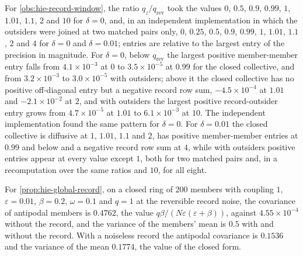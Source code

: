 \begin{numcheck}
For \cref{obs:hie-record-window}, the ratio $q_z/q_{\mathrm{rev}}$ took the values $0$, $0.5$, $0.9$, $0.99$, $1$, $1.01$, $1.1$, $2$ and $10$ for $\delta=0$, and, in an independent implementation in which the outsiders were joined at two matched pairs only, $0$, $0.25$, $0.5$, $0.9$, $0.99$, $1$, $1.01$, $1.1$, $2$ and $4$ for $\delta=0$ and $\delta=0.01$; entries are relative to the largest entry of the precision in magnitude. For $\delta=0$, below $q_{\mathrm{rev}}$ the largest positive member-member entry falls from $4.1\times10^{-3}$ at $0$ to $3.5\times10^{-5}$ at $0.99$ for the closed collective, and from $3.2\times10^{-3}$ to $3.0\times10^{-5}$ with outsiders; above it the closed collective has no positive off-diagonal entry but a negative record row sum, $-4.5\times10^{-4}$ at $1.01$ and $-2.1\times10^{-2}$ at $2$, and with outsiders the largest positive record-outsider entry grows from $4.7\times10^{-5}$ at $1.01$ to $6.1\times10^{-3}$ at $10$. The independent implementation found the same pattern for $\delta=0$. For $\delta=0.01$ the closed collective is diffusive at $1$, $1.01$, $1.1$ and $2$, has positive member-member entries at $0.99$ and below and a negative record row sum at $4$, while with outsiders positive entries appear at every value except $1$, both for two matched pairs and, in a recomputation over the same ratios and $10$, for all eight.

For \cref{prop:hie-global-record}, on a closed ring of $200$ members with coupling $1$, $\varepsilon=0.01$, $\beta=0.2$, $\omega=0.1$ and $q=1$ at the reversible record noise, the covariance of antipodal members is $0.4762$, the value $q\beta/(N\varepsilon(\varepsilon+\beta))$, against $4.55\times10^{-4}$ without the record, and the variance of the members' mean is $0.5$ with and without the record. With a noiseless record the antipodal covariance is $0.1536$ and the variance of the mean $0.1774$, the value of the closed form.
\end{numcheck}

